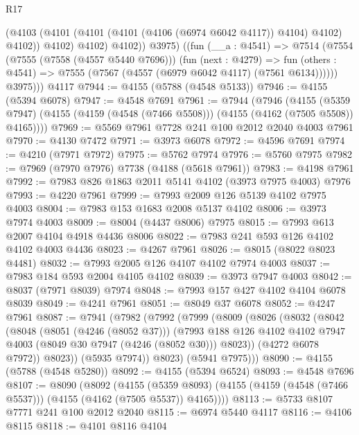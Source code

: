 \begin{lexlean}{R17}
\begin{coremodule}
                (@4103 (@4101 (@4101 (@4101 (@4106 (@6974 @6042 @4117)) @4104) @4102) @4102))
                @4102)
              @4102)
            @4102))
          @3975)
        ((fun (__a : @4541) =>
        @7514
          (@7554
            (@7555 (@7558 (@4557 @5440 @7696)))
            (fun (next : @4279) =>
            fun (others : @4541) => @7555 (@7567 (@4557 (@6979 @6042 @4117) (@7561 @6134))))))
          @3975)))
    @4117
@7944 := @4155 (@5788 (@4548 @5133))
@7946 := @4155 (@5394 @6078)
@7947 := @4548 @7691
@7961 := @7944
    (@7946
      (@4155
        (@5359 @7947)
        (@4155 (@4159 (@4548 (@7466 @5508))) (@4155 (@4162 (@7505 @5508)) @4165))))
@7969 := @5569 @7961 @7728 @241 @100 @2012 @2040 @4003 @7961
@7970 := @4130 @7472
@7971 := @3973 @6078
@7972 := @4596 @7691
@7974 := @4210 (@7971 @7972)
@7975 := @5762 @7974
@7976 := @5760 @7975
@7982 := @7969 (@7970 @7976) @7738 (@4188 (@5618 @7961))
@7983 := @4198 @7961
@7992 := @7983 @826 @1863 @2011 @5141 @4102 (@3973 @7975 @4003) @7976
@7993 := @4220 @7961
@7999 := @7993 @2009 @126 @5139 @4102 @7975 @4003
@8004 := @7983 @153 @1683 @2008 @5137 @4102
@8006 := @3973 @7974 @4003
@8009 := @8004 (@4437 @8006) @7975
@8015 := @7993 @613 @2007 @4104 @4918 @4436 @8006
@8022 := @7983 @241 @593 @126 @4102 @4102 @4003 @4436
@8023 := @4267 @7961
@8026 := @8015 (@8022 @8023 @4481)
@8032 := @7993 @2005 @126 @4107 @4102 @7974 @4003
@8037 := @7983 @184 @593 @2004 @4105 @4102
@8039 := @3973 @7947 @4003
@8042 := @8037 (@7971 @8039) @7974
@8048 := @7993 @157 @427 @4102 @4104 @6078 @8039
@8049 := @4241 @7961
@8051 := @8049 @37 @6078
@8052 := @4247 @7961
@8087 := @7941
    (@7982
      (@7992
        (@7999
          (@8009
            (@8026
              (@8032
                (@8042
                  (@8048
                    (@8051 (@4246 (@8052 @37)))
                    (@7993
                      @188
                      @126
                      @4102
                      @4102
                      @7947
                      @4003
                      (@8049 @30 @7947 (@4246 (@8052 @30)))
                      @8023))
                  (@4272 @6078 @7972))
                @8023))
            (@5935 @7974))
          @8023)
        (@5941 @7975)))
@8090 := @4155 (@5788 (@4548 @5280))
@8092 := @4155 (@5394 @6524)
@8093 := @4548 @7696
@8107 := @8090
    (@8092
      (@4155
        (@5359 @8093)
        (@4155 (@4159 (@4548 (@7466 @5537))) (@4155 (@4162 (@7505 @5537)) @4165))))
@8113 := @5733 @8107 @7771 @241 @100 @2012 @2040
@8115 := @6974 @5440 @4117
@8116 := @4106 @8115
@8118 := @4101 @8116 @4104

\end{coremodule}
\end{lexlean}
